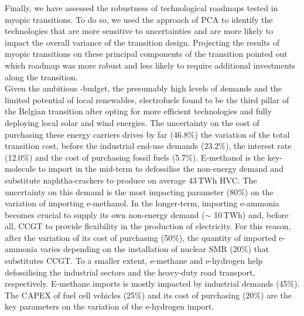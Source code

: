 Finally, we have assessed the robustness of technological roadmaps tested in myopic transitions. To do so, we used the approach of \acrfull{PCA} to identify the technologies that are more sensitive to uncertainties and are more likely to impact the overall variance of the transition design. Projecting the results of myopic transitions on these principal components of the transition pointed out which roadmap was more robust and less likely to require additional investments along the transition.\\

Given the ambitious -budget, the presumably high levels of demands and the limited potential of local renewables, electrofuels found to be the third pillar of the Belgian transition after opting for more efficient technologies and fully deploying local solar and wind energies.  The uncertainty on the cost of purchasing these energy carriers drives by far (46.8\%) the variation of the total transition cost, before the industrial end-use demands (23.2\%), the interest rate (12.0\%) and the cost of purchasing fossil fuels (5.7\%). E-methanol is the key-molecule to import in the mid-term to defossilise the non-energy demand and substitute naphtha-crackers to produce on average 43\,TWh \acrfull{HVC}. The uncertainty on this demand is the most impacting parameter (80\%) on the variation of importing e-methanol. In the longer-term, importing e-ammonia becomes crucial to supply its own non-energy demand ($\sim$ 10\,TWh) and, before all, \acrfull{CCGT} to provide flexibility in the production of electricity. For this reason, after the variation of its cost of purchasing (50\%), the quantity of imported e-ammonia varies depending on the installation of nuclear \acrfull{SMR} (20\%) that substitutes \gls{CCGT}. To a smaller extent, e-methane and e-hydrogen help defossilising the industrial sectors and the heavy-duty road transport, respectively. E-methane imports is mostly impacted by industrial demands (45\%). The CAPEX of fuel cell vehicles (25\%) and its cost of purchasing (20\%) are the key parameters on the variation of the e-hydrogen import.

